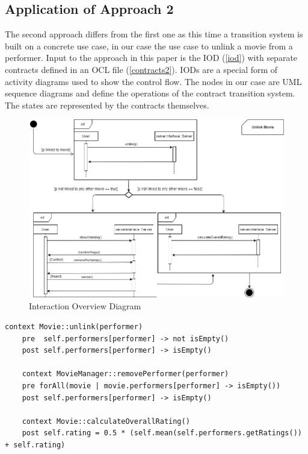 \subsection{Application of Approach 2}

The second approach differs from the first one as this time a transition system is built on a concrete use case, in our case the use case to unlink a movie from a performer. Input to the approach in this paper is the IOD (\autoref{iod}) with separate contracts defined in an OCL file (\autoref{contracts2}). IODs are a special form of activity diagrams used to show the control flow. The nodes in our case are UML sequence diagrams and define the operations of the contract transition system. The states are represented by the contracts themselves. 

\begin{figure}[h]
	\centering
	\includegraphics[width=\textwidth]{./images/iod.png}
	\caption{Interaction Overview Diagram}
	\label{iod}
\end{figure}

\begin{lstlisting}[caption={Contracts written in OCL},label={contracts2}]
	context Movie::unlink(performer)
	pre  self.performers[performer] -> not isEmpty()
	post self.performers[performer] -> isEmpty()
	
	context MovieManager::removePerformer(performer)
	pre forAll(movie | movie.performers[performer] -> isEmpty())
	post self.performers[performer] -> isEmpty()
	
	context Movie::calculateOverallRating()
	post self.rating = 0.5 * (self.mean(self.performers.getRatings()) + self.rating)
\end{lstlisting}

